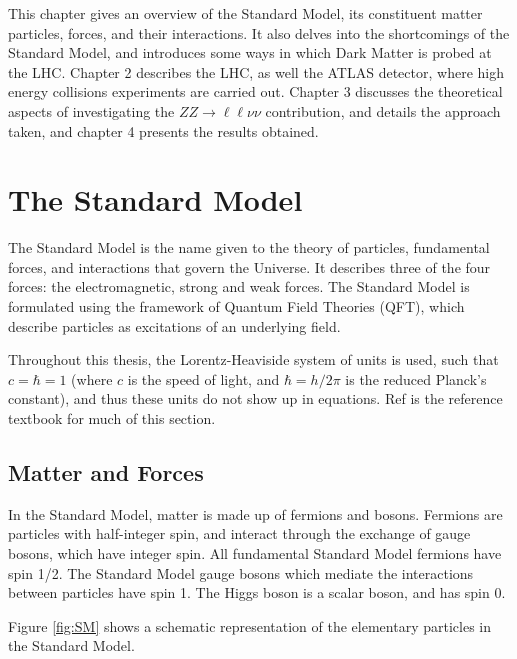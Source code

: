 \documentclass[12pt,a4paper,openright,twoside]{report}
\newcommand{\ZZ}{$ZZ\to \ell\ell\nu\nu$ }
\begin{document}
This chapter gives an overview of the Standard Model, its constituent matter particles, forces, and their interactions. It also delves into the shortcomings of the Standard Model, and introduces some ways in which Dark Matter is probed at the LHC. Chapter 2 describes the LHC, as well the ATLAS detector, where high energy collisions experiments are carried out. Chapter 3 discusses the theoretical aspects of investigating the \ZZ contribution, and details the approach taken, and chapter 4 presents the results obtained.

\section{The Standard Model}
The Standard Model is the name given to the theory of particles, fundamental forces, and interactions that govern the Universe. It describes three of the four forces: the electromagnetic, strong and weak forces. The Standard Model is formulated using the framework of Quantum Field Theories (QFT), which describe particles as excitations of an underlying field.

Throughout this thesis, the Lorentz-Heaviside system of units is used, such that $c=\hbar=1$ (where $c$ is the speed of light, and $\hbar=h/2\pi$ is the reduced Planck's constant), and thus these units do not show up in equations. Ref \cite{griff} is the reference textbook for much of this section.

\subsection{Matter and Forces}

In the Standard Model, matter is made up of fermions and bosons. Fermions are particles with half-integer spin, and interact through the exchange of gauge bosons, which have integer spin. All fundamental Standard Model fermions have spin 1/2. The Standard Model gauge bosons which mediate the interactions between particles have spin 1. The Higgs boson is a scalar boson, and has spin 0.

Figure \ref{fig:SM} shows a schematic representation of the elementary particles in the Standard Model.
\end{document}
